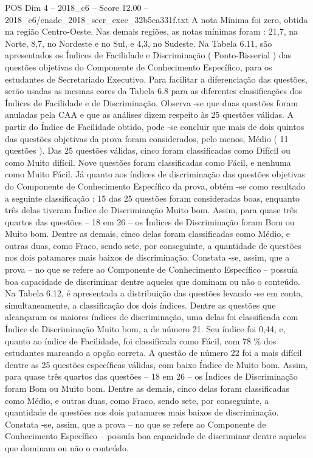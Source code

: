 \begin{textsample}{POS Dim 4 – 2018\_c6 – Score 12.00 – 2018\_c6/enade\_2018\_secr\_exec\_32b5ea331f.txt}
A nota Mínima foi zero, obtida na região Centro-Oeste.
Nas demais regiões, as notas mínimas foram : 21,7, na Norte, 8,7, no Nordeste e no Sul, e 4,3, no Sudeste.
Na Tabela 6.11, são apresentados os Índices de Facilidade e Discriminação ( Ponto-Bisserial ) das questões objetivas do Componente de Conhecimento Específico, para os estudantes de Secretariado Executivo.
Para facilitar a diferenciação das questões, serão usadas as mesmas cores da Tabela 6.8 para as diferentes classificações dos Índices de Facilidade e de Discriminação.
Observa -se que duas questões foram anuladas pela CAA e que as análises dizem respeito às 25 questões válidas.
A partir do Índice de Facilidade obtido, pode -se concluir que mais de dois quintos das questões objetivas da prova foram considerados, pelo menos, Médio ( 11 questões ).
Das 25 questões válidas, cinco foram classificadas como Difícil ou como Muito difícil.
Nove questões foram classificadas como Fácil, e nenhuma como Muito Fácil.
Já quanto aos índices de discriminação das questões objetivas do Componente de Conhecimento Específico da prova, obtém -se como resultado a seguinte classificação : 15 das 25 questões foram consideradas boas, enquanto três delas tiveram Índice de Discriminação Muito bom.
Assim, para quase três quartos das questões – 18 em 26 – os Índices de Discriminação foram Bom ou Muito bom.
Dentre as demais, cinco delas foram classificadas como Médio, e outras duas, como Fraco, sendo sete, por conseguinte, a quantidade de questões nos dois patamares mais baixos de discriminação.
Constata -se, assim, que a prova – no que se refere ao Componente de Conhecimento Específico – possuía boa capacidade de discriminar dentre aqueles que dominam ou não o conteúdo.
Na Tabela 6.12, é apresentada a distribuição das questões levando -se em conta, simultaneamente, a classificação dos dois índices.
Dentre as questões que alcançaram os maiores índices de discriminação, uma delas foi classificada com Índice de Discriminação Muito bom, a de número 21.
Seu índice foi 0,44, e, quanto ao índice de Facilidade, foi classificada como Fácil, com 78 \% dos estudantes marcando a opção correta.
A questão de número 22 foi a mais difícil dentre as 25 questões específicas válidas, com baixo Índice de Muito bom.
Assim, para quase três quartos das questões – 18 em 26 – os Índices de Discriminação foram Bom ou Muito bom.
Dentre as demais, cinco delas foram classificadas como Médio, e outras duas, como Fraco, sendo sete, por conseguinte, a quantidade de questões nos dois patamares mais baixos de discriminação.
Constata -se, assim, que a prova – no que se refere ao Componente de Conhecimento Específico – possuía boa capacidade de discriminar dentre aqueles que dominam ou não o conteúdo.

\end{textsample}
